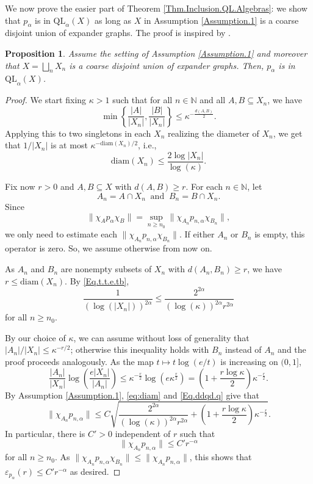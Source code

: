 \documentclass[11pt]{amsart}
\newcommand{\N}{\mathbb{N}}
\newcommand{\eps}{\varepsilon}
\numberwithin{equation}{section}
\newtheorem{proposition}[theorem]{Proposition}
\theoremstyle{definition}
\theoremstyle{remark}
\begin{document}
We now prove the easier part of Theorem \ref{Thm.Inclusion.QL.Algebras}: we show that $p_\alpha$ is in $\mathrm{QL}_\alpha(X)$ as long as $X$ in Assumption \ref{Assumption.1} is a coarse disjoint union of expander graphs. The proof is inspired by \cite[Theorem B]{Ozawa2023}.

\begin{proposition}\label{Prop.palpha.is.inQLalpha.exp}
   Assume the  setting of Assumption \ref{Assumption.1} and moreover that  $X=\bigsqcup_nX_n$ is a coarse disjoint union of expander graphs. Then,  $p_\alpha$ is in $\mathrm{QL}_\alpha(X)$.
\end{proposition}

\begin{proof}
We start fixing $\kappa>1$ such that for all  $n\in\N$ and all $A,B\subseteq X_n$, we have
\[\min\left\{\frac{|A |}{|X_n|}, \frac{|B|}{|X_n|}\right\}\leq \kappa^{-\frac{d(A,B)}{2}}.\]
Applying this to two singletons in each $X_n$ realizing the diameter of $X_n$, we get that ${1}/{|X_n|}$ is at most  $\kappa^{-\mathrm{diam}(X_n)/2}$, i.e., 
\begin{equation}\label{Eq.t.t.e.tb}\mathrm{diam}(X_n)\leq \frac{2\log |X_n|}{\log(\kappa)}.\end{equation} 


Fix now $r>0$ and $A,B\subseteq X$ with $d(A,B)\geq r$. For each $n\in\N$, let \[A_n=A\cap X_n\ \text{ and }\ B_n=B\cap X_n.\] Since
\[
\|\chi_Ap_\alpha\chi_B\|=\sup_{n\geq n_0}\|\chi_{A_n}p_{n,\alpha}\chi_{B_n}\|,
\]
we only need to estimate each $\|\chi_{A_n}p_{n,\alpha}\chi_{B_n}\|$.
If either $A_n$ or $B_n$ is empty,  this operator is zero. So, we  assume otherwise from now on.

  As $A_n$ and $B_n$ are nonempty subsets of $X_n$ with $d(A_n,B_n)\geq r$, we have $r\leq\mathrm{diam}(X_n)$. By \eqref{Eq.t.t.e.tb},  
\begin{equation}\label{eq:diam}
\frac{1}{(\log(|X_n|))^{2\alpha}}\leq\frac{2^{2\alpha}}{(\log(\kappa))^{2\alpha}r^{2\alpha}}
\end{equation}
for all $n\geq n_0$.

By our choice of $\kappa$,  we can assume without loss of generality that   $|A_n|/|X_n|\leq\kappa^{-r/2}$; otherwise this inequality holds with $B_n$ instead of $A_n$ and the proof proceeds analogously. As the map $t\mapsto t\log(e/t)$ is increasing on $(0,1]$,
\begin{equation}\label{Eq.ddqd.q}
\frac{|A_n|}{|X_n|}\log\left(\frac{e|X_n|}{|A_n|}\right)\leq\kappa^{-\frac r2}\log\left(e\kappa^{\frac r2}\right)=\left(1+\frac{r\log\kappa}{2}\right)\kappa^{-\frac r2}.
\end{equation}
By Assumption \ref{Assumption.1},    \eqref{eq:diam} and \eqref{Eq.ddqd.q} give that
\[\|\chi_{A_n}p_{n,\alpha}\|\leq C\sqrt{\frac{2^{2\alpha}}{(\log(\kappa))^{2\alpha}r^{2\alpha}}+ \left(1+\frac{r\log\kappa}{2}\right)\kappa^{-\frac r2}}.\]
In particular, there is $C'>0$ independent of $r$ such that
\[\|\chi_{A_n}p_{n,\alpha}\|\leq C'r^{-\alpha}\]
for all $n\geq n_0$. As $\|\chi_{A_n}p_{n,\alpha}\chi_{B_n}\|\leq \|\chi_{A_n}p_{n,\alpha}\|$, this shows that $\eps_{p_\alpha}(r)\leq C'r^{-\alpha}$ as desired.  \end{proof}
\end{document}
